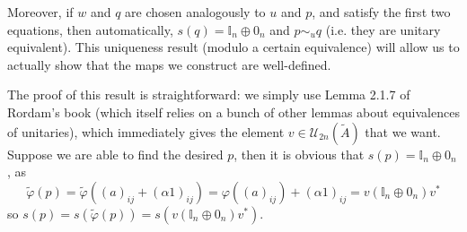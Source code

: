 \documentclass[aps,pra,showpacs,notitlepage,onecolumn,superscriptaddress,nofootinbib]{revtex4-1}
\theoremstyle{definition}
\begin{document}
Moreover, if $w$ and $q$ are chosen analogously to $u$ and $p$,
and satisfy the first two equations, then automatically, $s(q) = \mathbb{I}_n \oplus 0_n$ and $p \sim_u q$ (i.e. they are unitary equivalent). This uniqueness result (modulo a certain equivalence)
will allow us to actually show that the maps we construct are well-defined.

The proof of this result is straightforward: we simply use Lemma 2.1.7 of Rordam's book (which itself relies on a bunch of other lemmas about equivalences of unitaries),
which immediately gives the element $v \in \mathcal{U}_{2n}(\widetilde{A})$ that we want. Suppose we are able to find the desired $p$, then it is obvious that $s(p) = \mathbb{I}_n \oplus 0_n$,
as
\begin{equation}
\widetilde{\varphi}(p) = \widetilde{\varphi}((a)_{ij} + (\alpha 1)_{ij}) = \varphi((a)_{ij}) + (\alpha 1)_{ij} = v (\mathbb{I}_n \oplus 0_n) v^{*}
\end{equation}
so $s(p) = s(\widetilde{\varphi}(p)) = s(v (\mathbb{I}_n \oplus 0_n) v^{*})$.
\end{document}
